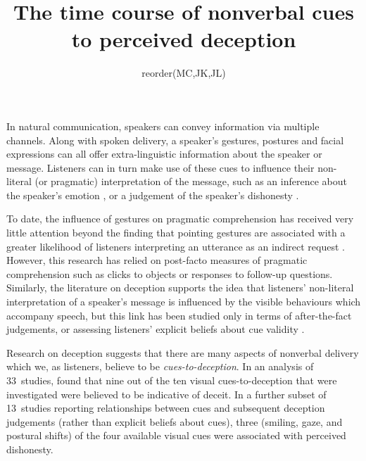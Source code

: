 \documentclass[a4paper,man,natbib]{apa6}
\title{The time course of nonverbal cues to perceived deception}
\author{reorder(MC,JK,JL)}
\affiliation{Psychology, PPLS, University of Edinburgh}
\newcommand*{\term}[1]{\emph{#1}} %
\begin{document}
\maketitle
\linenumbers
\noindent
In natural communication, speakers can convey information via multiple channels.
Along with spoken delivery, a speaker's gestures, postures and facial expressions can all offer extra-linguistic information about the speaker or message.
Listeners can in turn make use of these cues to influence their non-literal (or pragmatic) interpretation of the message, such as an inference about the speaker's emotion \citep{Busso2004, Gregersen2005}, or a judgement of the speaker's dishonesty \citep{Zuckerman1981}.

To date, the influence of gestures on pragmatic comprehension has received very little attention beyond the finding that pointing gestures are associated with a greater likelihood of listeners interpreting an utterance as an indirect request \citep[See][]{Kelly1999, Kelly2001}.
However, this research has relied on post-facto measures of pragmatic comprehension such as clicks to objects or responses to follow-up questions.
Similarly, the literature on deception supports the idea that listeners' non-literal interpretation of a speaker's message is influenced by the visible behaviours which accompany speech, but this link has been studied only in terms of after-the-fact judgements, or assessing listeners' explicit beliefs about cue validity \citep[See][]{Vrij1996a, Zuckerman1981a}.

Research on deception suggests that there are many aspects of nonverbal delivery which we, as listeners, believe to be \term{cues-to-deception}. 
In an analysis of 33~studies, \citet{Zuckerman1981} found that nine out of the ten visual cues-to-deception that were investigated were believed to be indicative of deceit. 
In a further subset of 13~studies reporting relationships between cues and subsequent deception judgements (rather than explicit beliefs about cues), three (smiling, gaze, and postural shifts) of the four available visual cues were associated with perceived dishonesty.
\end{document}
